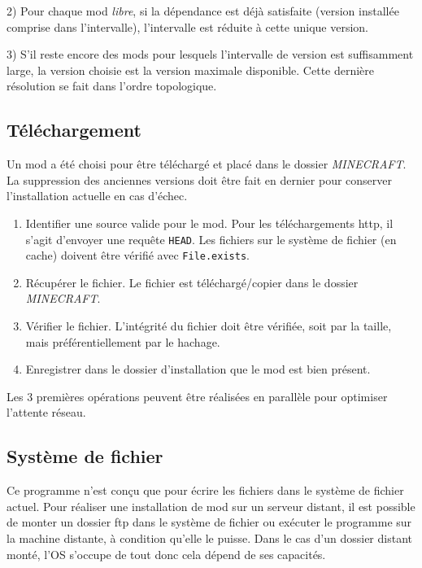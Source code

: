 \documentclass{article}
\begin{document}
2) Pour chaque mod \textit{libre}, si la dépendance est déjà satisfaite (version installée comprise dans l'intervalle), l'intervalle est réduite à cette unique version.

3) S'il reste encore des mods pour lesquels l'intervalle de version est suffisamment large, la version choisie est la version maximale disponible.
Cette dernière résolution se fait dans l'ordre topologique.

\subsection{Téléchargement}
Un mod a été choisi pour être téléchargé et placé dans le dossier \textit{MINECRAFT}.
La suppression des anciennes versions doit être fait en dernier pour conserver l'installation actuelle en cas d'échec.

\begin{enumerate}
	\item Identifier une source valide pour le mod.
Pour les téléchargements http, il s'agit d'envoyer une requête \texttt{HEAD}.
Les fichiers sur le système de fichier (en cache) doivent être vérifié avec \texttt{File.exists}.
	\item Récupérer le fichier.
Le fichier est téléchargé/copier dans le dossier \textit{MINECRAFT}.
	\item Vérifier le fichier.
L'intégrité du fichier doit être vérifiée, soit par la taille, mais préférentiellement par le hachage.
	\item Enregistrer dans le dossier d'installation que le mod est bien présent.
\end{enumerate}

Les 3 premières opérations peuvent être réalisées en parallèle pour optimiser l'attente réseau.

\subsection{Système de fichier}
Ce programme n'est conçu que pour écrire les fichiers dans le système de fichier actuel.
Pour réaliser une installation de mod sur un serveur distant, il est possible de monter un dossier ftp dans le système de fichier ou exécuter le programme sur la machine distante, à condition qu'elle le puisse.
Dans le cas d'un dossier distant monté, l'OS s'occupe de tout donc cela dépend de ses capacités.
	
\end{document}
